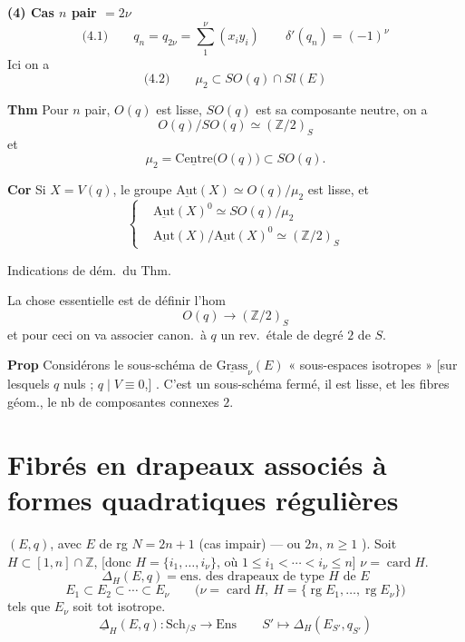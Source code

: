 \documentclass[11pt,a4paper]{article}
\begin{document}
\textbf{(4) Cas $n$ pair $= 2\nu$}
\[
  \text{(4.1)} \qquad q_n = q_{2\nu} = \sum_{1}^{\nu} (x_i y_i)
  \qquad \delta'(q_n) = (-1)^\nu
\]
 Ici on a
\[
  \text{(4.2)} \qquad \mu_2 \subset SO(q) \cap Sl(E)
\]

\textbf{Thm} Pour $n$ pair, $O(q)$ est lisse, $SO(q)$ est sa composante neutre,
on a
\[
  O(q)/SO(q) \simeq (\mathbb{Z}/2)_S
\]
et
\[
  \mu_2 = \underline{\mathrm{Centre}}\bigl(O(q)\bigr) \subset SO(q) .
\]

\textbf{Cor} Si $X = V(q)$, le groupe $\underline{\mathrm{Aut}}(X) \simeq O(q)/\mu_2$
est lisse, et
\[
\left\{
\begin{aligned}
  &\underline{\mathrm{Aut}}(X)^{0} \simeq SO(q)/\mu_2 \\
  &\underline{\mathrm{Aut}}(X)/\underline{\mathrm{Aut}}(X)^{0} \simeq (\mathbb{Z}/2)_S
\end{aligned}
\right.
\]

Indications de dém.\ du Thm.

La chose essentielle est de définir l'hom \struck{\ill{}} 
\[
  O(q) \longrightarrow (\mathbb{Z}/2)_S
\]
et pour ceci on va associer canon.\ à $q$ un rev.\ étale de degré $2$ de $S$.

\textbf{Prop} Considérons le sous-schéma de $\underline{\mathrm{Grass}}_\nu(E)$
   « sous-espaces isotropes
 » [sur lesquels $q$ 
 nuls ; $q \mid V \equiv 0$,] .
C'est un sous-schéma fermé, il est lisse, et 
les fibres géom., le nb de composantes connexes  $2$.

\section{Fibrés en drapeaux associés à   formes quadratiques régulières}

$(E,q)$, avec $E$ de rg $N = 2n+1$ (cas impair) — ou $2n$,
$n \geqslant 1$ ). Soit $H \subset [1,n] \cap \mathbb{Z}$,
[donc $H = \{i_1, \ldots, i_\nu\}$, où $1 \leqslant i_1 < \cdots < i_\nu \leqslant n$]
 $\nu = \operatorname{card} H$.
\[
  \Delta_H(E,q) = \text{ens.\ des drapeaux de type } H \text{ de } E
\]
\[
  E_1 \subset E_2 \subset \cdots \subset E_\nu
  \qquad \bigl(\nu = \operatorname{card} H,\ H = \{\operatorname{rg} E_1, \ldots, \operatorname{rg} E_\nu\}\bigr)
\]
tels que  $E_\nu$ soit tot isotrope.
\[
  \underline{\Delta}_H(E,q) : \mathrm{Sch}_{/S} \longrightarrow \mathrm{Ens}
  \qquad S' \longmapsto \Delta_H(E_{S'}, q_{S'})
\]
\end{document}

